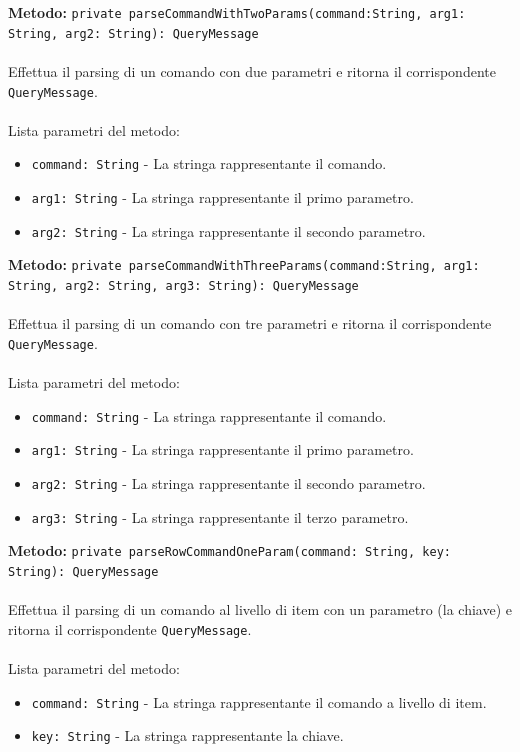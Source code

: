 \documentclass[a4paper]{article}
\begin{document}
			\textbf{Metodo: }\texttt{private parseCommandWithTwoParams(command:String, arg1: String, arg2: String): QueryMessage}
			\\ \\
			Effettua il parsing di un comando con due parametri e ritorna il corrispondente \texttt{QueryMessage}.
			\\ \\
			Lista parametri del metodo:
			\begin{itemize}
				\item \texttt{command: String} - La stringa rappresentante il comando.
				\item \texttt{arg1: String} - La stringa rappresentante il primo parametro.
				\item \texttt{arg2: String} - La stringa rappresentante il secondo parametro.
			\end{itemize}
			\textbf{Metodo: }\texttt{private parseCommandWithThreeParams(command:String, arg1: String, arg2: String, arg3: String): QueryMessage}
			\\ \\
			Effettua il parsing di un comando con tre parametri e ritorna il corrispondente \texttt{QueryMessage}.
			\\ \\
			Lista parametri del metodo:
			\begin{itemize}
				\item \texttt{command: String} - La stringa rappresentante il comando.
				\item \texttt{arg1: String} - La stringa rappresentante il primo parametro.
				\item \texttt{arg2: String} - La stringa rappresentante il secondo parametro.
				\item \texttt{arg3: String} - La stringa rappresentante il terzo parametro.
			\end{itemize}
			\textbf{Metodo: }\texttt{private parseRowCommandOneParam(command: String, key: String): QueryMessage}
			\\ \\
			Effettua il parsing di un comando al livello di item con un parametro (la chiave) e ritorna il corrispondente \texttt{QueryMessage}.
			\\ \\
			Lista parametri del metodo:
			\begin{itemize}
				\item \texttt{command: String} - La stringa rappresentante il comando a livello di item.
				\item \texttt{key: String} - La stringa rappresentante la chiave.
			\end{itemize}
\end{document}
